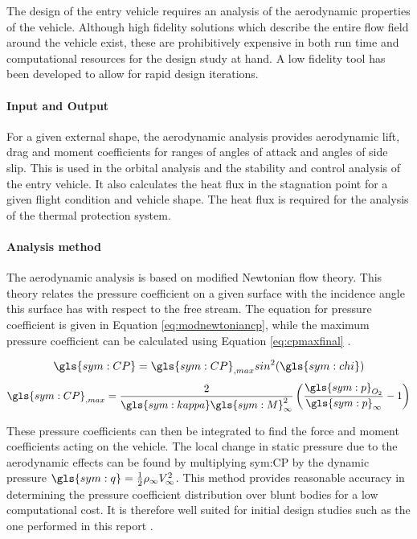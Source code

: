 The design of the entry vehicle requires an analysis of the aerodynamic properties of the vehicle. Although high fidelity solutions which describe the entire flow field around the vehicle exist, these are prohibitively expensive in both run time and computational resources for the design study at hand. A low fidelity tool has been developed to allow for rapid design iterations. 

\paragraph{Input and Output}
For a given external shape, the aerodynamic analysis provides aerodynamic lift, drag and moment coefficients for ranges of angles of attack and angles of side slip. This is used in the orbital analysis and the stability and control analysis of the entry vehicle. It also calculates the heat flux in the stagnation point for a given flight condition and vehicle shape. The heat flux is required for the analysis of the thermal protection system. 

\paragraph{Analysis method}
The aerodynamic analysis is based on modified Newtonian flow theory. This theory relates the pressure coefficient on a given surface with the incidence angle this surface has with respect to the free stream. The equation for pressure coefficient is given in Equation \ref{eq:modnewtoniancp}, while the maximum pressure coefficient can be calculated using Equation \ref{eq:cpmaxfinal}  \cite{AndersonJr.2006}.

\begin{multicols}{2}
	\begin{equation}
		\gls{sym:CP}=\gls{sym:CP}_{,max}sin^{2}(\gls{sym:chi})
		\label{eq:modnewtoniancp}
	\end{equation} \break
	\begin{equation}
		\gls{sym:CP}_{,max} = \frac{2}{\gls{sym:kappa} \gls{sym:M}_{\infty}^{2}}\left(\frac{\gls{sym:p}_{O_{2}}}{\gls{sym:p}_{\infty}}-1\right)
		\label{eq:cpmaxfinal}
	\end{equation}
\end{multicols}

These pressure coefficients can then be integrated to find the force and moment coefficients acting on the vehicle. The local change in static pressure due to the aerodynamic effects can be found by multiplying \gls{sym:CP} by the dynamic pressure $\gls{sym:q}=\frac{1}{2}\rho_{\infty}V_{\infty}^{2}$. This method provides reasonable accuracy in determining the pressure coefficient distribution over blunt bodies for a low computational cost. It is therefore well suited for initial design studies such as the one performed in this report \cite{AndersonJr.2006}.

